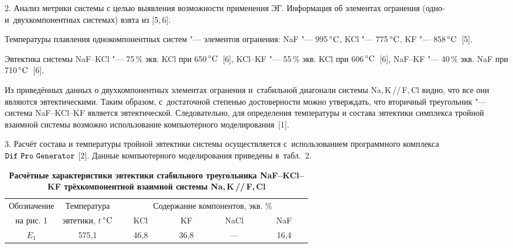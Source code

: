 2. Анализ метрики системы с целью выявления возможности применения ЭГ. 
Информация об элементах огранения (одно- и~двухкомпонентных системах) взята 
из [5,\,6]. 

Температуры плавления однокомпонентных систем "--- элементов огранения: 
NaF "--- 995\,$\rm^\circ C$, \linebreak KCl "--- 775\,$\rm^\circ C$, KF "--- 858\,$\rm^\circ C$~[5].

Эвтектика системы NaF--KCl "---  75\,{\%} экв. KCl при 650\,$\rm^\circ C$~[6],
KCl--KF "---  55\,{\%} экв. KCl при 606\,$\rm^\circ C$~[6],
NaF--KF "---  40\,{\%} экв. NaF при 710\,$\rm^\circ C$~[6].

Из приведённых данных о двухкомпонентных элементах огранения и~стабильной 
диагонали системы Na,\,K\,/\!/\,F,\,Cl видно, что все они являются эвтектическими. 
Таким образом, с~достаточной степенью достоверности можно утверждать, что 
вторичный треугольник "--- система NaF--KCl--KF является эвтектической. 
Следовательно, для определения температуры и состава эвтектики симплекса 
тройной взаимной системы возможно использование компьютерного моделирования~[1]. 

3. Расчёт состава и температуры тройной эвтектики системы осуществляется с~использованием программного комплекса $\tt Dif\,\,Pro\,\,Generator$ [2]. Данные компьютерного моделирования приведены в~табл.~2.

\begin{table}[b!]
\vspace{-5mm}
\centering
\begin{minipage}{13cm}
\caption{\small \bfseries Расчётные характеристики эвтектики стабильного треугольника
NaF--KCl--KF трёхкомпонентной взаимной системы Na,\,K\,//\,F,\,Cl}
\vspace{-3mm} 
\noindent
\begin{tabular}{l|l|l|lll}
\hline
\multicolumn{1}{c|}{Обозначение } & \multicolumn{1}{c|}{Температура} & \multicolumn{4}{c}{Содержание компонентов, экв. \%} \\ 
\cline{3-6}
\multicolumn{1}{c|}{на рис. 1} & \multicolumn{1}{c|}{эвтетики, $t$\,$\rm^\circ C$} & \multicolumn{1}{c|}{~~~KCl~~~} & \multicolumn{1}{c|}{~~~KF~~~} & \multicolumn{1}{c|}{~~~NaCl~~~} & \multicolumn{1}{c}{~~~NaF~~~} \\ 
\hline
\multicolumn{1}{c|}{$E_1$} & \multicolumn{1}{c|}{575{,}1} & \multicolumn{1}{c|}{46{,}8} & \multicolumn{1}{c|}{36{,}8} & \multicolumn{1}{c|}{---} & \multicolumn{1}{c}{16{,}4} \\ 
\hline
 \end{tabular}
 \end{minipage}
\renewcommand{\bfdefault}{bx}
 \end{table}



